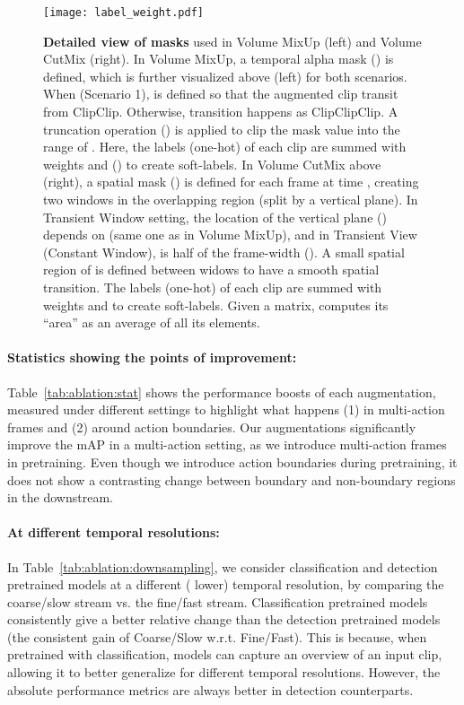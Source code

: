 \documentclass[letterpaper]{article} \usepackage{aaai23}  \usepackage{times}  \usepackage{helvet}  \usepackage{courier}  \usepackage[hyphens]{url}  \usepackage{graphicx} \urlstyle{rm} \def\UrlFont{\rm}  \usepackage{natbib}  \usepackage{caption} \frenchspacing  \setlength{\pdfpagewidth}{8.5in}  \setlength{\pdfpageheight}{11in}  \usepackage{algorithm}
\newcommand{\tref}[1]{Table~\ref{#1}}
\begin{document}
\begin{figure*}[]
	\centering
	\texttt{[image: label\_weight.pdf]}
	\caption{\textbf{Detailed view of masks} used in Volume MixUp (left) and Volume CutMix (right). In Volume MixUp, a temporal alpha mask () is defined, which is further visualized above (left) for both scenarios. When  (Scenario 1),  is defined so that the augmented clip transit from ClipClip. Otherwise, transition happens as ClipClipClip. A truncation operation () is applied to clip the mask value into the range of . Here, the labels (one-hot) of each clip are summed with weights  and () to create soft-labels. In Volume CutMix above (right), a spatial mask () is defined for each frame at time , creating two windows in the overlapping region (split by a vertical plane). In Transient Window setting, the location of the vertical plane () depends on  (same one as in Volume MixUp), and in Transient View (Constant Window),  is half of the frame-width (). A small spatial region of  is defined between widows to have a smooth spatial transition. 
The labels (one-hot) of each clip are summed with weights  and  to create soft-labels.  Given a matrix,  computes its ``area'' as an average of all its elements. }
	\vspace{-3mm}
	\label{fig:app}
\end{figure*}

\paragraph{Statistics showing the points of improvement:} \tref{tab:ablation:stat} shows the performance boosts of each augmentation, measured under different settings to highlight what happens (1) in multi-action frames and (2) around action boundaries. Our augmentations significantly improve the mAP in a multi-action setting, as we introduce multi-action frames in pretraining. Even though we introduce action boundaries during pretraining, it does not show a contrasting change between boundary and non-boundary regions in the downstream.

\paragraph{At different temporal resolutions:} In \tref{tab:ablation:downsampling}, we consider classification and detection pretrained models at a different ( lower) temporal resolution, by comparing the coarse/slow stream vs. the fine/fast stream. Classification pretrained models consistently give a better relative change than the detection pretrained models (the consistent gain of Coarse/Slow w.r.t. Fine/Fast). This is because, when pretrained with classification, models can capture an overview of an input clip, allowing it to better generalize for different temporal resolutions. However, the absolute performance metrics are always better in detection counterparts.
\end{document}
